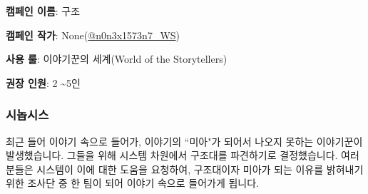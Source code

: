 \documentclass{report}
\begin{document}
	\textbf{캠페인 이름}: 구조
	
	\textbf{캠페인 작가}: None(\href{https://www.twitter.com/n0n3x1573n7_WS}{@n0n3x1573n7\_WS})
	
	\textbf{사용 룰}: 이야기꾼의 세계(World of the Storytellers)
	
	\textbf{권장 인원}: 2 \textasciitilde 5인
	
	\subsubsection*{시놉시스}
		최근 들어 이야기 속으로 들어가, 이야기의 ``미아"가 되어서 나오지 못하는 이야기꾼이 발생했습니다.  그들을 위해 시스템 차원에서 구조대를 파견하기로 결정했습니다. 여러분들은 시스템이 이에 대한 도움을 요청하여, 구조대이자 미아가 되는 이유를 밝혀내기 위한 조사단 중 한 팀이 되어 이야기 속으로 들어가게 됩니다.
	
\end{document}
